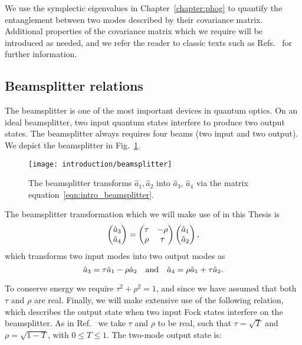 \noindent We use the symplectic eigenvalues in Chapter~\ref{chapter:phog} to quantify the entanglement between two modes described by their covariance matrix. Additional properties of the covariance matrix which we require will be introduced as needed, and we refer the reader to classic texts such as Refs.~\cite{Weedbrook2012, Serafini2017} for further information.


\FloatBarrier
\subsection{Beamsplitter relations}
The beamsplitter is one of the most important devices in quantum optics. On an ideal beamsplitter, two input quantum states interfere to produce two output states. The beamsplitter always requires four beams (two input and two output). We depict the beamsplitter in Fig.~\ref{fig:intro_beamsplitter}. %


\begin{figure}[htp]
\centering
\captionsetup{width=0.8\linewidth}
\texttt{[image: introduction/beamsplitter]}
\caption{\label{fig:intro_beamsplitter} The beamsplitter transforms $\hat{a}_1, \hat{a}_2$ into $\hat{a}_3$, $\hat{a}_4$ via the matrix equation~\ref{eqn:intro_beamsplitter}.}
\end{figure}


The beamsplitter transformation which we will make use of in this Thesis is
\begin{equation}\label{eqn:intro_beamsplitter}
\pmqty{\hat{a}_3 \\ \hat{a}_4} = \pmqty{\tau & -\rho \\  \rho & \tau} \pmqty{\hat{a}_1 \\ \hat{a}_2},
\end{equation}
which transforms two input modes into two output modes as
\begin{equation}
\hat{a}_3 = \tau \hat{a}_1 - \rho \hat{a}_2 \qq{and} \hat{a}_4 = \rho \hat{a}_1 + \tau \hat{a}_2.
\end{equation}

\noindent To conserve energy we require $\tau^2 + \rho^2 = 1$, and since we have assumed that both $\tau$ and $\rho$ are real. %
Finally, we will make extensive use of the following relation, which describes the output state when two input Fock states interfere on the beamsplitter. As in Ref.~\cite{Leonhardt2010} we take $\tau$ and $\rho$ to be real, such that $\tau = \sqrt{T}$ and $\rho = \sqrt{1-T}$, with $0 \le T \le 1$. The two-mode output state is:

